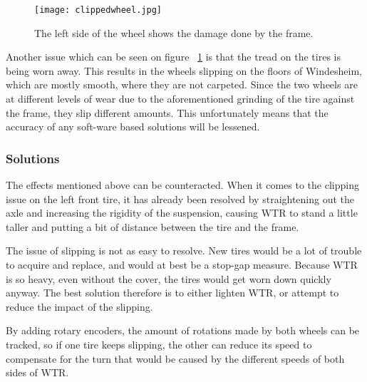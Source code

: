 \begin{figure}[H]
\centering
\texttt{[image: clippedwheel.jpg]}
\label{fig::wheelclip}
\caption{The left side of the wheel shows the damage done by the frame.}
\end{figure}

Another issue which can be seen on figure ~\ref{fig::wheelclip} is that the tread on the tires is being worn away.
This results in the wheels slipping on the floors of Windesheim, which are mostly smooth, where they are not carpeted.
Since the two wheels are at different levels of wear due to the aforementioned grinding of the tire against the frame, they slip different amounts.
This unfortunately means that the accuracy of any soft-ware based solutions will be lessened.

\subsubsection{Solutions}
The effects mentioned above can be counteracted.
When it comes to the clipping issue on the left front tire, it has already been resolved by straightening out the axle and increasing the rigidity of the suspension, causing WTR to stand a little taller and putting a bit of distance between the tire and the frame.

The issue of slipping is not as easy to resolve.
New tires would be a lot of trouble to acquire and replace, and would at best be a stop-gap measure.
Because WTR is so heavy, even without the cover, the tires would get worn down quickly anyway.
The best solution therefore is to either lighten WTR, or attempt to reduce the impact of the slipping.

By adding rotary encoders, the amount of rotations made by both wheels can be tracked, so if one tire keeps slipping, the other can reduce its speed to compensate for the turn that would be caused by the different speeds of both sides of WTR.





\newpage